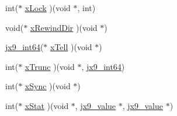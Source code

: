 \begin{DoxyCompactItemize}
\item 
int($\ast$ \hyperlink{structjx9__io__stream_a3db6ad62b21591bdc81d620d2bcd9d0b}{x\-Lock} )(void $\ast$, int)
\item 
void($\ast$ \hyperlink{structjx9__io__stream_acc37504a38ef9aa76c8cbcdc467c94f9}{x\-Rewind\-Dir} )(void $\ast$)
\item 
\hyperlink{unqlite_8c_aeaac5ecf324354b1c4bb9f6559bab7af}{jx9\-\_\-int64}($\ast$ \hyperlink{structjx9__io__stream_ab7733b807f15d82b170799439a203c5f}{x\-Tell} )(void $\ast$)
\item 
int($\ast$ \hyperlink{structjx9__io__stream_ad8580da931139bbe35bf97953ddf173e}{x\-Trunc} )(void $\ast$, \hyperlink{unqlite_8c_aeaac5ecf324354b1c4bb9f6559bab7af}{jx9\-\_\-int64})
\item 
int($\ast$ \hyperlink{structjx9__io__stream_aa150d524652a28b07d001153154aac0f}{x\-Sync} )(void $\ast$)
\item 
int($\ast$ \hyperlink{structjx9__io__stream_a21e84bf7eff6b38ea9a87ab575acb77b}{x\-Stat} )(void $\ast$, \hyperlink{structjx9__value}{jx9\-\_\-value} $\ast$, \hyperlink{structjx9__value}{jx9\-\_\-value} $\ast$)
\end{DoxyCompactItemize}


